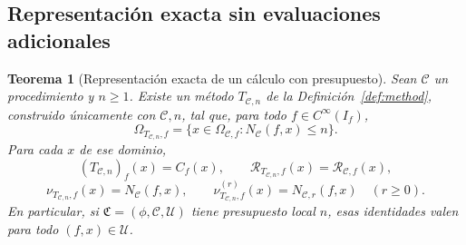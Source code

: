 \documentclass[11pt,a4paper]{article}
\numberwithin{equation}{section}
\newtheorem{theorem}{Teorema}[section]
\theoremstyle{definition}
\theoremstyle{remark}
\newcommand{\Rec}{\mathcal R}
\begin{document}
\subsection{Representación exacta sin evaluaciones adicionales}
\begin{theorem}[Representación exacta de un cálculo con presupuesto]\label{thm:exactrepresentation}\label{lem:serialization}\label{prop:automatic}
Sean $\mathscr C$ un procedimiento y $n\ge1$. Existe un método $T_{\mathscr C,n}$ de la Definición~\ref{def:method}, construido únicamente con $\mathscr C,n$, tal que, para todo $f\in C^\infty(I_f)$,
\begin{equation}\label{eq:exactdomain}
\Omega_{T_{\mathscr C,n},f}
=\{x\in\Omega_{\mathscr C,f}:N_{\mathscr C}(f,x)\le n\}.
\end{equation}
Para cada $x$ de ese dominio,
\begin{equation}\label{eq:exactrecords}
(T_{\mathscr C,n})_f(x)=C_f(x),\qquad
\Rec_{T_{\mathscr C,n},f}(x)=\Rec_{\mathscr C,f}(x),
\end{equation}
\begin{equation}\label{eq:exactcounts}
\nu_{T_{\mathscr C,n},f}(x)=N_{\mathscr C}(f,x),\qquad
\nu^{(r)}_{T_{\mathscr C,n},f}(x)=N_{\mathscr C,r}(f,x)\quad(r\ge0).
\end{equation}
En particular, si $\mathfrak C=(\phi,\mathscr C,\mathcal U)$ tiene presupuesto local $n$, esas identidades valen para todo $(f,x)\in\mathcal U$.
\end{theorem}
\end{document}
